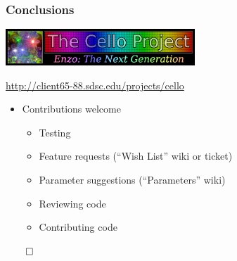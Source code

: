 \begin{frame}[fragile] \frametitle{Conclusions}
\centerline{\includegraphics[width=2.8in]{cello-logo.png}}
\centerline{\footnotesize{\textcolor{blue}{\url{http://client65-88.sdsc.edu/projects/cello}}}}

\centerline{\footnotesize{}}
\centerline{\footnotesize{}}

\begin{itemize}
\item Contributions welcome
\begin{itemize}
\item Testing
\item Feature requests (``Wish List'' wiki or ticket)
\item Parameter suggestions (``Parameters'' wiki)
\item Reviewing code
\item Contributing code
\end{itemize}
\end{itemize}
\centerline{$\qed$}
\end{frame}
